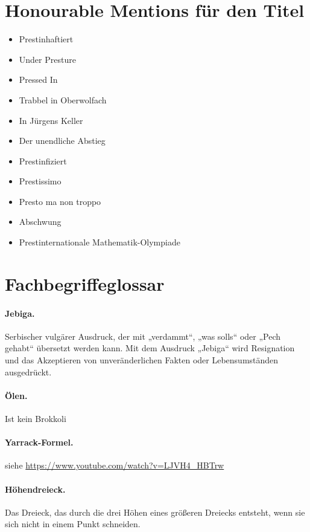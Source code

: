 \documentclass[oneside]{memoir}
\begin{document}
\section*{Honourable Mentions für den Titel}
\begin{itemize}
\item Prestinhaftiert
\item Under Presture
\item Pressed In
\item Trabbel in Oberwolfach
\item In Jürgens Keller
\item Der unendliche Abstieg
\item Prestinfiziert
\item Prestissimo
\item Presto ma non troppo
\item Abschwung
\item Prestinternationale Mathematik-Olympiade
\end{itemize}

\section*{Fachbegriffeglossar}

\paragraph{Jebiga.} Serbischer vulgärer Ausdruck, der mit „verdammt“, „was solls“ oder „Pech gehabt“ übersetzt werden kann. Mit dem Ausdruck „Jebiga“ wird Resignation und das Akzeptieren von unveränderlichen Fakten oder Lebensumständen ausgedrückt.

\paragraph{Ölen.} Ist kein Brokkoli

\paragraph{Yarrack-Formel.} siehe \url{https://www.youtube.com/watch?v=LJVH4_HBTrw}

\paragraph{Höhendreieck.}  Das Dreieck, das durch die drei Höhen eines größeren Dreiecks entsteht, wenn sie sich nicht in einem Punkt schneiden.
\end{document}
